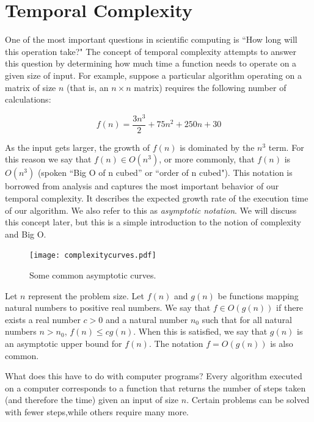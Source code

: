 

\section*{Temporal Complexity}
One of the most important questions in scientific computing is ``How long will this operation take?"
The concept of temporal complexity attempts to answer this question by determining how much time a function needs to operate on a given size of input. 
For example, suppose a particular algorithm operating on a matrix of size $n$ (that is, an $n \times n$ matrix) requires the following number of calculations:

\begin{equation*}
f(n) = \frac{3n^3}{2} + 75n^2 + 250n + 30
\end{equation*}

As the input gets larger, the growth of $f(n)$ is dominated by the $n^3$ term.
For this reason we say that $f(n) \in O(n^3)$, or more commonly, that $f(n)$ is $O(n^3)$ (spoken ``Big O of n cubed'' or ``order of n cubed").
This notation is borrowed from analysis and captures the most important behavior of our temporal complexity. It describes the expected growth rate of the execution time of our algorithm. We also refer to this as \emph{asymptotic notation}.
We will discuss this concept later, but this is a simple introduction to the notion of complexity and Big O.

\begin{figure}
\centering
\texttt{[image: complexitycurves.pdf]}
\caption{Some common asymptotic curves.}
\end{figure}

\begin{definition}
Let $n$ represent the problem size.  Let $f(n)$ and $g(n)$ be functions mapping natural numbers to positive real numbers. We say that $f \in O(g(n))$ if there exists a real number $c > 0$ and a natural number $n_0$ such that for all natural numbers $n > n_0$, $f(n) \leq cg(n)$.
When this is satisfied, we say that $g(n)$ is an asymptotic upper bound for $f(n)$. 
The notation $f = O(g(n))$ is also common.
\end{definition}

What does this have to do with computer programs?
Every algorithm executed on a computer corresponds to a function
that returns the number of steps taken (and therefore the time)
given an input of size $n$.  Certain problems can be solved with fewer steps,while others require many more.  

